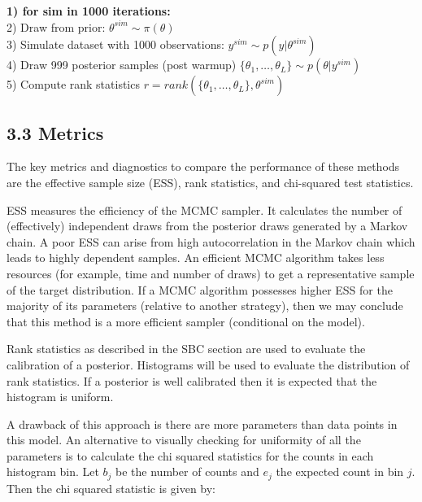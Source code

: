 \documentclass[
  12pt,
  letterpaper,
  DIV=11,
  numbers=noendperiod]{scrartcl}
\begin{document}
\textbf{1) for sim in 1000 iterations:}\\
\hspace*{0.333em}\hspace*{0.333em}2) Draw from prior:
\(\theta^{sim}\sim\pi (\theta)\)\\
\hspace*{0.333em}\hspace*{0.333em}3) Simulate dataset with 1000
observations: \(y^{sim} \sim p(y|\theta^{sim})\)\\
\hspace*{0.333em}\hspace*{0.333em}4) Draw 999 posterior samples (post
warmup) \(\{\theta_1,\dots , \theta_{L}\} \sim p(\theta | y^{sim})\)\\
\hspace*{0.333em}\hspace*{0.333em}5) Compute rank statistics
\(r = rank(\{\theta_1,\dots , \theta_{L}\}, \theta^{sim})\)

\hypertarget{metrics}{%
\subsection{3.3 Metrics}\label{metrics}}

The key metrics and diagnostics to compare the performance of these
methods are the effective sample size (ESS), rank statistics, and
chi-squared test statistics.

ESS measures the efficiency of the MCMC sampler. It calculates the
number of (effectively) independent draws from the posterior draws
generated by a Markov chain. A poor ESS can arise from high
autocorrelation in the Markov chain which leads to highly dependent
samples. An efficient MCMC algorithm takes less resources (for example,
time and number of draws) to get a representative sample of the target
distribution. If a MCMC algorithm possesses higher ESS for the majority
of its parameters (relative to another strategy), then we may conclude
that this method is a more efficient sampler (conditional on the model).

Rank statistics as described in the SBC section are used to evaluate the
calibration of a posterior. Histograms will be used to evaluate the
distribution of rank statistics. If a posterior is well calibrated then
it is expected that the histogram is uniform.

A drawback of this approach is there are more parameters than data
points in this model. An alternative to visually checking for uniformity
of all the parameters is to calculate the chi squared statistics for the
counts in each histogram bin. Let \(b_j\) be the number of counts and
\(e_j\) the expected count in bin \(j\). Then the chi squared statistic
is given by:
\end{document}

